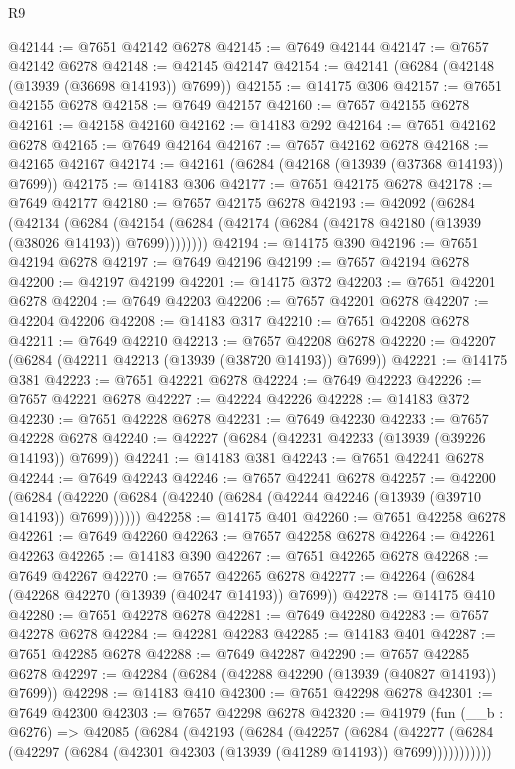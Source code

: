 \begin{lexlean}{R9}
\begin{coremodule}
@42144 := @7651 @42142 @6278
@42145 := @7649 @42144
@42147 := @7657 @42142 @6278
@42148 := @42145 @42147
@42154 := @42141 (@6284 (@42148 (@13939 (@36698 @14193)) @7699))
@42155 := @14175 @306
@42157 := @7651 @42155 @6278
@42158 := @7649 @42157
@42160 := @7657 @42155 @6278
@42161 := @42158 @42160
@42162 := @14183 @292
@42164 := @7651 @42162 @6278
@42165 := @7649 @42164
@42167 := @7657 @42162 @6278
@42168 := @42165 @42167
@42174 := @42161 (@6284 (@42168 (@13939 (@37368 @14193)) @7699))
@42175 := @14183 @306
@42177 := @7651 @42175 @6278
@42178 := @7649 @42177
@42180 := @7657 @42175 @6278
@42193 := @42092
    (@6284
      (@42134
        (@6284 (@42154 (@6284 (@42174 (@6284 (@42178 @42180 (@13939 (@38026 @14193)) @7699))))))))
@42194 := @14175 @390
@42196 := @7651 @42194 @6278
@42197 := @7649 @42196
@42199 := @7657 @42194 @6278
@42200 := @42197 @42199
@42201 := @14175 @372
@42203 := @7651 @42201 @6278
@42204 := @7649 @42203
@42206 := @7657 @42201 @6278
@42207 := @42204 @42206
@42208 := @14183 @317
@42210 := @7651 @42208 @6278
@42211 := @7649 @42210
@42213 := @7657 @42208 @6278
@42220 := @42207 (@6284 (@42211 @42213 (@13939 (@38720 @14193)) @7699))
@42221 := @14175 @381
@42223 := @7651 @42221 @6278
@42224 := @7649 @42223
@42226 := @7657 @42221 @6278
@42227 := @42224 @42226
@42228 := @14183 @372
@42230 := @7651 @42228 @6278
@42231 := @7649 @42230
@42233 := @7657 @42228 @6278
@42240 := @42227 (@6284 (@42231 @42233 (@13939 (@39226 @14193)) @7699))
@42241 := @14183 @381
@42243 := @7651 @42241 @6278
@42244 := @7649 @42243
@42246 := @7657 @42241 @6278
@42257 := @42200
    (@6284 (@42220 (@6284 (@42240 (@6284 (@42244 @42246 (@13939 (@39710 @14193)) @7699))))))
@42258 := @14175 @401
@42260 := @7651 @42258 @6278
@42261 := @7649 @42260
@42263 := @7657 @42258 @6278
@42264 := @42261 @42263
@42265 := @14183 @390
@42267 := @7651 @42265 @6278
@42268 := @7649 @42267
@42270 := @7657 @42265 @6278
@42277 := @42264 (@6284 (@42268 @42270 (@13939 (@40247 @14193)) @7699))
@42278 := @14175 @410
@42280 := @7651 @42278 @6278
@42281 := @7649 @42280
@42283 := @7657 @42278 @6278
@42284 := @42281 @42283
@42285 := @14183 @401
@42287 := @7651 @42285 @6278
@42288 := @7649 @42287
@42290 := @7657 @42285 @6278
@42297 := @42284 (@6284 (@42288 @42290 (@13939 (@40827 @14193)) @7699))
@42298 := @14183 @410
@42300 := @7651 @42298 @6278
@42301 := @7649 @42300
@42303 := @7657 @42298 @6278
@42320 := @41979
    (fun (__b : @6276) =>
    @42085
      (@6284
        (@42193
          (@6284
            (@42257
              (@6284
                (@42277
                  (@6284 (@42297 (@6284 (@42301 @42303 (@13939 (@41289 @14193)) @7699)))))))))))

\end{coremodule}
\end{lexlean}
